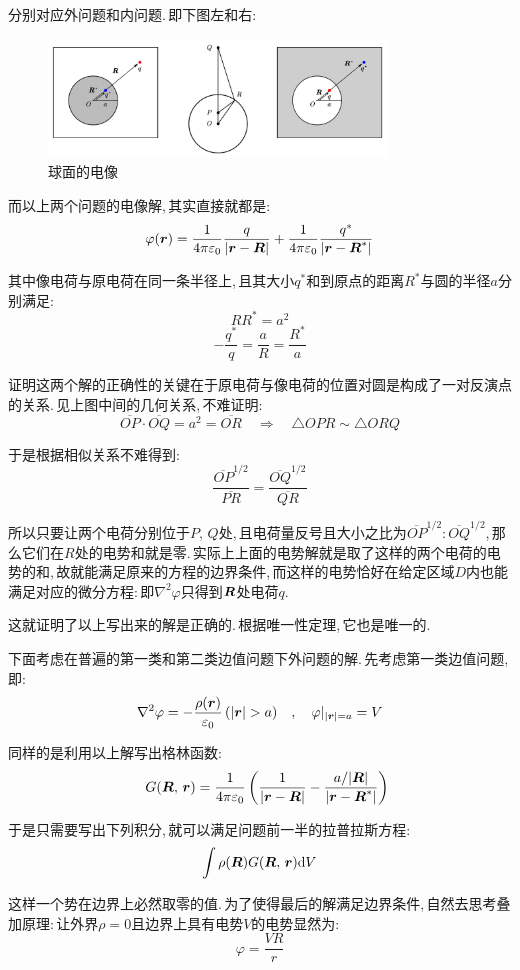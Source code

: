 分别对应外问题和内问题.\,即下图左和右:
\begin{figure}[H]
\centering
\includegraphics[width=0.8\textwidth]{image/7-2-10.png}
\caption{球面的电像}
\end{figure}

而以上两个问题的电像解,\,其实直接就都是:
\[\varphi(\boldsymbol{r}) =\frac{1}{4\pi\varepsilon_0} \frac{q}{|\boldsymbol{r}-\boldsymbol{R}|}+\frac{1}{4\pi\varepsilon_0} \frac{q^\ast}{|\boldsymbol{r}-\boldsymbol{R}^\ast|}\]

其中像电荷与原电荷在同一条半径上,\,且其大小$q^\ast$和到原点的距离$R^\ast$与圆的半径$a$分别满足:
\[RR^\ast=a^2\]
\[-\frac{q^\ast}{q}=\frac{a}{R}=\frac{R^\ast}{a}\]

证明这两个解的正确性的关键在于原电荷与像电荷的位置对圆是构成了一对反演点的关系.\,见上图中间的几何关系,\,不难证明:
\[\overline{OP}\cdot\overline{OQ}=a^2=\overline{OR}\quad \Rightarrow \quad \triangle OPR\sim \triangle ORQ\]

于是根据相似关系不难得到:
\[\frac{{\overline{OP}}^{1/2}}{\overline{PR}}=\frac{{\overline{OQ}}^{1/2}}{\overline{QR}}\]

所以只要让两个电荷分别位于$P,\,Q$处,\,且电荷量反号且大小之比为${\overline{OP}}^{1/2}:{\overline{OQ}}^{1/2}$,\,那么它们在$R$处的电势和就是零.\,实际上上面的电势解就是取了这样的两个电荷的电势的和,\,故就能满足原来的方程的边界条件,\,而这样的电势恰好在给定区域$D$内也能满足对应的微分方程:\,即$\nabla^2\varphi$只得到$\boldsymbol{R}$处电荷$q$.

这就证明了以上写出来的解是正确的.\,根据唯一性定理,\,它也是唯一的.

\vspace{0.5cm}
下面考虑在普遍的第一类和第二类边值问题下外问题的解.\,先考虑第一类边值问题,\,即:
\[\nabla^2\varphi = -\frac{\rho(\bs{r})}{\varepsilon_0}\,(|\bs{r}|>a)\quad ,\quad \varphi|_{|\bs{r}|=a}=V\]

同样的是利用以上解写出格林函数:
\[\quad G(\boldsymbol{R},\,\boldsymbol{r})=\frac{1}{4\pi\varepsilon_0} \left(\frac{1}{|\boldsymbol{r}-\boldsymbol{R}|}-\frac{a/|\boldsymbol{R}|}{|\boldsymbol{r}-\boldsymbol{R}^\ast|}\right)\]

于是只需要写出下列积分,\,就可以满足问题前一半的拉普拉斯方程:
\[\int \rho(\boldsymbol{R})G(\boldsymbol{R},\,\boldsymbol{r})\textrm{d} V \]

这样一个势在边界上必然取零的值.\,为了使得最后的解满足边界条件,\,自然去思考叠加原理:\,让外界$\rho=0$且边界上具有电势$V$的电势显然为:
\[\varphi=\frac{VR}{r}\]

